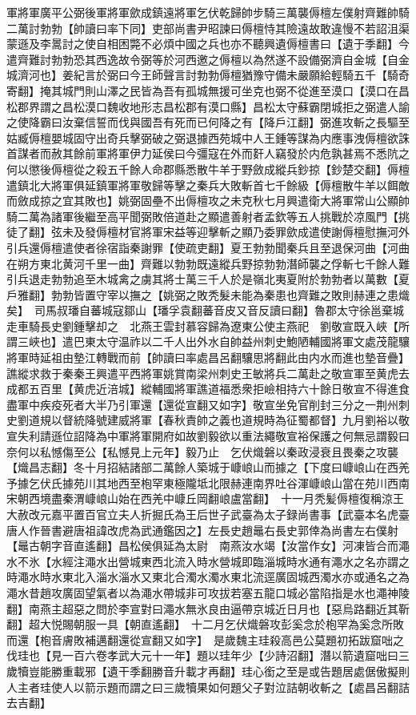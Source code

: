 軍將軍廣平公弼後軍將軍歛成鎮遠將軍乞伏乾歸帥步騎三萬襲傉檀左僕射齊難帥騎二萬討勃勃【帥讀曰率下同】吏部尚書尹昭諫曰傉檀恃其險遠故敢違慢不若詔沮渠蒙遜及李暠討之使自相困斃不必煩中國之兵也亦不聽興遺傉檀書曰【遺于季翻】今遣齊難討勃勃恐其西逸故令弼等於河西邀之傉檀以為然遂不設備弼濟自金城【自金城濟河也】姜紀言於弼曰今王師聲言討勃勃傉檀猶豫守備未嚴願給輕騎五千【騎奇寄翻】掩其城門則山澤之民皆為吾有孤城無援可坐克也弼不從進至漠口【漠口在昌松郡界謂之昌松漠口魏收地形志昌松郡有漠口縣】昌松太守蘇霸閉城拒之弼遣人諭之使降霸曰汝棄信誓而伐與國吾有死而已何降之有【降戶江翻】弼進攻斬之長驅至姑臧傉檀嬰城固守出奇兵擊弼破之弼退據西苑城中人王鍾等謀為内應事洩傉檀欲誅首謀者而赦其餘前軍將軍伊力延侯曰今彊寇在外而姧人竊發於内危孰甚焉不悉阬之何以懲後傉檀從之殺五千餘人命郡縣悉散牛羊于野斂成縱兵鈔掠【鈔楚交翻】傉檀遣鎮北大將軍俱延鎮軍將軍敬歸等擊之秦兵大敗斬首七千餘級【傉檀散牛羊以餌敵而斂成掠之宜其敗也】姚弼固壘不出傉檀攻之未克秋七月興遣衛大將軍常山公顯帥騎二萬為諸軍後繼至高平聞弼敗倍道赴之顯遣善射者孟欽等五人挑戰於凉風門【挑徒了翻】弦未及發傉檀材官將軍宋益等迎擊斬之顯乃委罪歛成遣使謝傉檀慰撫河外引兵還傉檀遣使者徐宿詣秦謝罪【使疏吏翻】夏王勃勃聞秦兵且至退保河曲【河曲在朔方東北黄河千里一曲】齊難以勃勃既遠縱兵野掠勃勃潛師襲之俘斬七千餘人難引兵退走勃勃追至木城禽之虜其將士萬三千人於是嶺北夷夏附於勃勃者以萬數【夏戶雅翻】勃勃皆置守宰以撫之【姚弼之敗秃髮未能為秦患也齊難之敗則赫連之患熾矣】　司馬叔璠自蕃城寇鄒山【璠孚袁翻蕃音皮又音反讀曰翻】魯郡太守徐邕棄城走車騎長史劉鍾擊却之　北燕王雲封慕容歸為遼東公使主燕祀　劉敬宣既入峽【所謂三峽也】遣巴東太守温祚以二千人出外水自帥益州刺史鮑陋輔國將軍文處茂龍驤將軍時延祖由墊江轉戰而前【帥讀曰率處昌呂翻驤思將翻此由内水而進也墊音疊】譙縱求救于秦秦王興遣平西將軍姚賞南梁州刺史王敏將兵二萬赴之敬宣軍至黄虎去成都五百里【黄虎近涪城】縱輔國將軍譙道福悉衆拒嶮相持六十餘日敬宣不得進食盡軍中疾疫死者大半乃引軍還【還從宣翻又如字】敬宣坐免官削封三分之一荆州刺史劉道規以督統降號建威將軍【春秋責帥之義也道規時為征蜀都督】九月劉裕以敬宣失利請遜位詔降為中軍將軍開府如故劉毅欲以重法繩敬宣裕保護之何無忌謂毅曰奈何以私憾傷至公【私憾見上元年】毅乃止　乞伏熾磐以秦政浸衰且畏秦之攻襲【熾昌志翻】冬十月招結諸部二萬餘人築城于嵻㟍山而據之【下度曰嵻㟍山在西羌予據乞伏氏據苑川其地西至枹罕東極隴坻北限赫連南界吐谷渾嵻㟍山當在苑川西南宋朝西境盡秦渭嵻㟍山始在西羌中嵻丘岡翻㟍盧當翻】　十一月秃髪傉檀復稱涼王大赦改元嘉平置百官立夫人折掘氏為王后世子武臺為太子録尚書事【武臺本名虎臺唐人作晉書避唐祖諱改虎為武通鑑因之】左長史趙鼂右長史郭倖為尚書左右僕射【鼂古朝字音直遙翻】昌松侯俱延為太尉　南燕汝水竭【汝當作女】河凍皆合而澠水不氷【水經注澠水出營城東西北流入時水營城即臨淄城時水通有澠水之名亦謂之時澠水時水東北入淄水淄水又東北合濁水濁水東北流逕廣固城西濁水亦或通名之為澠水昔趙攻廣固望氣者以為澠水帶城非可攻拔若塞五龍口城必當陷指是水也澠神陵翻】南燕主超惡之問於李宣對曰澠水無氷良由逼帶京城近日月也【惡烏路翻近其靳翻】超大悦賜朝服一具【朝直遙翻】　十二月乞伏熾磐攻彭奚念於枹罕為奚念所敗而還【枹音膚敗補邁翻還從宣翻又如字】　是歲魏主珪殺高邑公莫題初拓跋窟咄之伐珪也【見一百六卷孝武大元十一年】題以珪年少【少詩沼翻】潛以箭遺窟咄曰三歲犢豈能勝重載邪【遺干季翻勝音升載才再翻】珪心銜之至是或告題居處倨傲擬則人主者珪使人以箭示題而謂之曰三歲犢果如何題父子對泣詰朝收斬之【處昌呂翻詰去吉翻】

